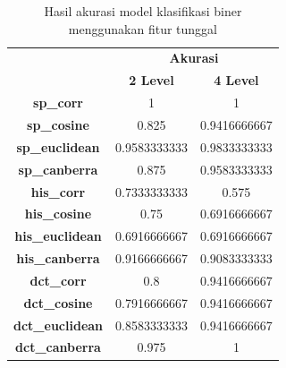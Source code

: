 \begin{table}[!ht]
	\centering
	\caption{Hasil akurasi model klasifikasi biner menggunakan fitur tunggal}
	\vspace{0.5em}
	\begin{tabular}{|c|cc|}
		\hline
		\multicolumn{1}{|l|}{}                   & \multicolumn{2}{c|}{\textbf{Akurasi}}                                                            \\ \cline{2-3}
		\multicolumn{1}{|l|}{\multirow{-2}{*}{}} & \multicolumn{1}{c|}{\textbf{2 Level}}                     & \textbf{4 Level}                     \\ \hline
		\textbf{sp\_corr}                        & \multicolumn{1}{c|}{\cellcolor[HTML]{34FF34}1}            & \cellcolor[HTML]{34FF34}1            \\ \hline
		\textbf{sp\_cosine}                      & \multicolumn{1}{c|}{0.825}                                & \cellcolor[HTML]{34FF34}0.9416666667 \\ \hline
		\textbf{sp\_euclidean}                   & \multicolumn{1}{c|}{0.9583333333}                         & \cellcolor[HTML]{34FF34}0.9833333333 \\ \hline
		\textbf{sp\_canberra}                    & \multicolumn{1}{c|}{0.875}                                & \cellcolor[HTML]{34FF34}0.9583333333 \\ \hline
		\textbf{his\_corr}                       & \multicolumn{1}{c|}{\cellcolor[HTML]{34FF34}0.7333333333} & 0.575                                \\ \hline
		\textbf{his\_cosine}                     & \multicolumn{1}{c|}{\cellcolor[HTML]{34FF34}0.75}         & 0.6916666667                         \\ \hline
		\textbf{his\_euclidean}                  & \multicolumn{1}{c|}{\cellcolor[HTML]{34FF34}0.6916666667} & \cellcolor[HTML]{34FF34}0.6916666667 \\ \hline
		\textbf{his\_canberra}                   & \multicolumn{1}{c|}{\cellcolor[HTML]{34FF34}0.9166666667} & 0.9083333333                         \\ \hline
		\textbf{dct\_corr}                       & \multicolumn{1}{c|}{0.8}                                  & \cellcolor[HTML]{34FF34}0.9416666667 \\ \hline
		\textbf{dct\_cosine}                     & \multicolumn{1}{c|}{0.7916666667}                         & \cellcolor[HTML]{34FF34}0.9416666667 \\ \hline
		\textbf{dct\_euclidean}                  & \multicolumn{1}{c|}{0.8583333333}                         & \cellcolor[HTML]{34FF34}0.9416666667 \\ \hline
		\textbf{dct\_canberra}                   & \multicolumn{1}{c|}{0.975}                                & \cellcolor[HTML]{34FF34}1            \\ \hline
	\end{tabular}
	\label{Tab: 4-hasilfiturtunggal}
\end{table}

